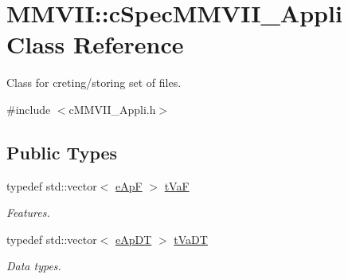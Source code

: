 \hypertarget{classMMVII_1_1cSpecMMVII__Appli}{}\section{M\+M\+V\+II\+:\+:c\+Spec\+M\+M\+V\+I\+I\+\_\+\+Appli Class Reference}
\label{classMMVII_1_1cSpecMMVII__Appli}


Class for creting/storing set of files.  




{\ttfamily \#include $<$c\+M\+M\+V\+I\+I\+\_\+\+Appli.\+h$>$}

\subsection*{Public Types}
\begin{DoxyCompactItemize}
\item 
typedef std\+::vector$<$ \hyperlink{MMVII__enums_8h_a2b533e7c1969156bbd29e1f845553015}{e\+ApF} $>$ \hyperlink{classMMVII_1_1cSpecMMVII__Appli_a3af3559a929dd6b4e691685fcf65c82f}{t\+VaF}\hypertarget{classMMVII_1_1cSpecMMVII__Appli_a3af3559a929dd6b4e691685fcf65c82f}{}\label{classMMVII_1_1cSpecMMVII__Appli_a3af3559a929dd6b4e691685fcf65c82f}

\begin{DoxyCompactList}\small\item\em Features. \end{DoxyCompactList}\item 
typedef std\+::vector$<$ \hyperlink{MMVII__enums_8h_a9a365e8e9c999d42caa0e139f1366a95}{e\+Ap\+DT} $>$ \hyperlink{classMMVII_1_1cSpecMMVII__Appli_a176c2d528029d322f10e428059c85b06}{t\+Va\+DT}\hypertarget{classMMVII_1_1cSpecMMVII__Appli_a176c2d528029d322f10e428059c85b06}{}\label{classMMVII_1_1cSpecMMVII__Appli_a176c2d528029d322f10e428059c85b06}

\begin{DoxyCompactList}\small\item\em Data types. \end{DoxyCompactList}\end{DoxyCompactItemize}
